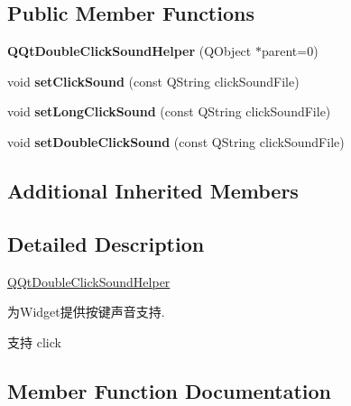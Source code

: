 \subsection*{Public Member Functions}
\begin{DoxyCompactItemize}
\item 
\mbox{\label{class_q_qt_double_click_sound_helper_a6e89f151ebf9d47ab6883df27c130174}} 
{\bfseries Q\+Qt\+Double\+Click\+Sound\+Helper} (Q\+Object $\ast$parent=0)
\item 
\mbox{\label{class_q_qt_double_click_sound_helper_a54b8d1383c5e926e42596d3d654e48d7}} 
void {\bfseries set\+Click\+Sound} (const Q\+String click\+Sound\+File)
\item 
\mbox{\label{class_q_qt_double_click_sound_helper_a502a9120e3dac008f90641d3dad1c165}} 
void {\bfseries set\+Long\+Click\+Sound} (const Q\+String click\+Sound\+File)
\item 
\mbox{\label{class_q_qt_double_click_sound_helper_ab8516943675e7cc99c28c74877bcbe68}} 
void {\bfseries set\+Double\+Click\+Sound} (const Q\+String click\+Sound\+File)
\end{DoxyCompactItemize}
\subsection*{Additional Inherited Members}


\subsection{Detailed Description}
\mbox{\hyperlink{class_q_qt_double_click_sound_helper}{Q\+Qt\+Double\+Click\+Sound\+Helper}}

为\+Widget提供按键声音支持.

支持 click 

\subsection{Member Function Documentation}
\mbox{\label{class_q_qt_double_click_sound_helper_abd77662870098b2d026df6f0cad313eb}} 
